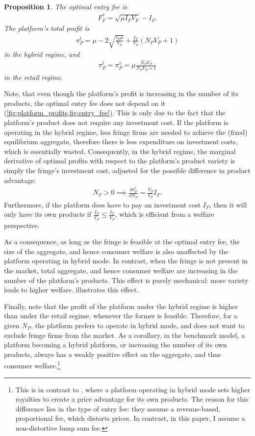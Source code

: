 \documentclass[a4paper]{article}
\newtheorem{proposition}{Proposition}
\begin{document}
\begin{proposition}
    \label{prop:optimal_entry_fee}
    The optimal entry fee is
    \begin{align*}
        F_F^* = \sqrt{\mu I_F V_F} - I_F.
    \end{align*}
    The platform's total profit is
    \begin{align*}
        \pi_P^{t} = \mu - 2\sqrt{\frac{I_F \mu}{V_F}} + \frac{I_F}{V_F} (N_P V_P + 1)
    \end{align*}
    in the hybrid regime, and
    \begin{align*}
        \pi_P^{t} = \pi_P^{v} = \mu \frac{ N_P V_P}{N_P V_P + 1}
    \end{align*}
    in the retail regime.
\end{proposition}
Note, that even though the platform's profit is increasing in the number of its products, the optimal entry fee does not depend on it (\cref{fig:platform_profits,fig:entry_fee}).
This is only due to the fact that the platform's product does not require any investment cost.
If the platform is operating in the hybrid regime, less fringe firms are needed to achieve the (fixed) equilibrium aggregate, therefore there is less expenditure on investment costs, which is essentially wasted.
Consequently, in the hybrid regime, the marginal derivative of optimal profits with respect to the platform's product variety is simply the fringe's investment cost, adjusted for the possible difference in product advantage:
\begin{align*}
    N_F > 0 \implies \frac{\partial \pi_P^t}{\partial N_P} = \frac{V_P}{V_F} I_F.
\end{align*}
Furthermore, if the platform does have to pay an investment cost $I_P$, then it will only have its own products if $\frac{I_P}{V_P} \leq \frac{I_F}{V_F}$, which is efficient from a welfare perspective.

As a consequence, as long as the fringe is feasible at the optimal entry fee, the size of the aggregate, and hence consumer welfare is also unaffected by the platform operating in hybrid mode.
In contrast, when the fringe is not present in the market, total aggregate, and hence consumer welfare are increasing in the number of the platform's products.
This effect is purely mechanical: more variety leads to higher welfare.
 illustrates this effect.

Finally, note that the profit of the platform under the hybrid regime is higher than under the retail regime, whenever the former is feasible.
Therefore, for a given $N_P$, the platform prefers to operate in hybrid mode, and does not want to exclude fringe firms from the market.
As a corollary, in the benchmark model, a platform becoming a hybrid platform, or increasing the number of its own products, always has a weakly positive effect on the aggregate, and thus consumer welfare.\footnote{
    This is in contrast to \textcite{anderson2021hybrid}, where a platform operating in hybrid mode sets higher royalties to create a price advantage for its own products.
    The reason for this difference lies in the type of entry fee: they assume a revenue-based, proportional fee, which distorts prices.
    In contrast, in this paper, I assume a non-distortive lump sum fee.
}
\end{document}
